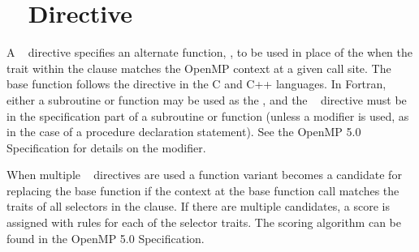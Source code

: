 \pagebreak
\section{~ Directive}
\label{sec:declare_variant}




A ~ directive specifies an alternate function, 
, to be used in place of the  
when the trait within the  clause matches the OpenMP context at a given call site.
The base function follows the directive in the C and C++ languages.
In Fortran, either a subroutine or function may be used as the ,
and the ~ directive must be in the specification 
part of a subroutine or function (unless a 
modifier is used, as in the case of a procedure declaration statement). See
the OpenMP 5.0 Specification for details on the modifier.

When multiple ~ directives are used 
a function variant becomes a candidate for replacing the base function if the
context at the base function call matches the traits of all selectors in the  clause.
If there are multiple candidates, a score is assigned with rules for each
of the selector traits. The scoring algorithm can be found in the OpenMP 5.0 Specification.

